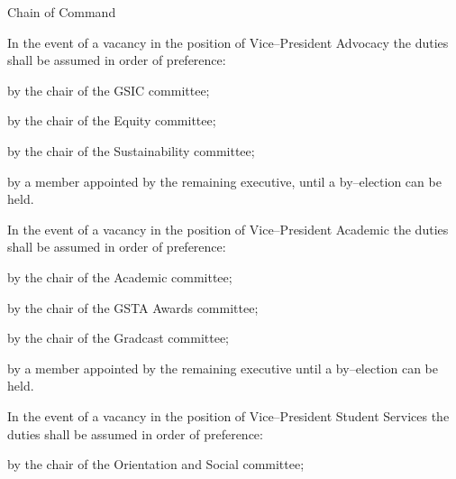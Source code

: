\begin{longenum}[ label*=\thesubsection.\arabic*., align=left]
	\item Chain of Command 
		\begin{longenum}[ label*=\arabic*., align=left]
			\item In the event of a vacancy in the position of Vice--President Advocacy the duties shall be assumed in order of preference:
			\begin{longenum}[ label*=\arabic*., align=left]
				\item by the chair of the GSIC committee;
				\item by the chair of the Equity committee;
                \item by the chair of the Sustainability committee;
				\item by a member appointed by the remaining executive, until a by--election can be held.
			\end{longenum}
			\item In the event of a vacancy in the position of Vice--President Academic the duties shall be assumed in order of preference:
			\begin{longenum}[ label*=\arabic*., align=left]
				\item by the chair of the Academic committee;
				\item by the chair of the GSTA Awards committee;
				\item by the chair of the Gradcast committee;
				\item by a member appointed by the remaining executive until a by--election can be held.
			\end{longenum}
			\item In the event of a vacancy in the position of Vice--President Student Services the duties shall be assumed in order of preference: 
			\begin{longenum}[ label*=\arabic*., align=left]
				\item by the chair of the Orientation and Social committee;

\end{longenum}
\end{longenum}
\end{longenum}
